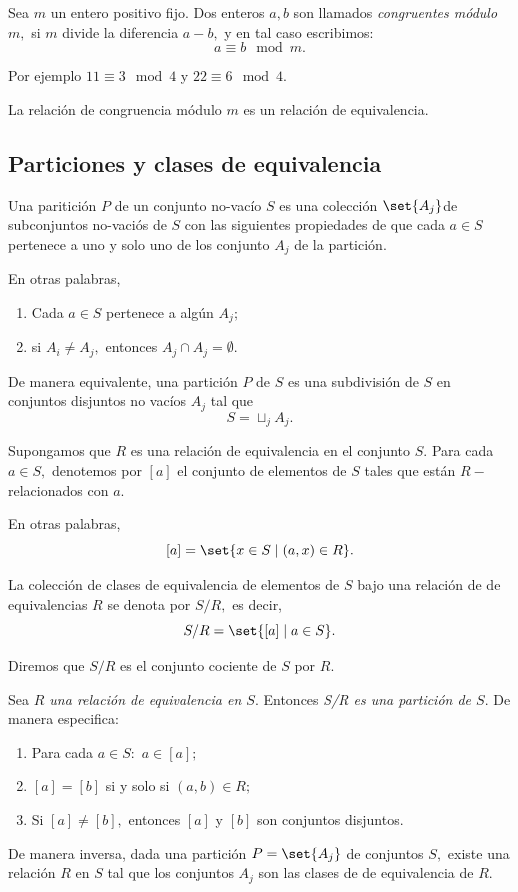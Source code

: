 	\label{lip:exmp:2.12.c}
	Sea $m$ un entero positivo fijo. Dos enteros $a,b$ son llamados \emph{congruentes módulo $m,$} si $m$ divide la diferencia $a-b,$ y en tal caso escribimos:
	$$
	a\equiv b \mod m.
	$$


	Por ejemplo $11\equiv 3 \mod 4$ y $22\equiv 6 \mod 4.$


	La relación de congruencia módulo $m$ es un relación de equivalencia.



\subsection{Particiones y clases de equivalencia}


	Una paritición $P$ de un conjunto no-vacío $S$ es una colección $\set{A_{j}}$de subconjuntos no-vaciós de $S$ con las siguientes propiedades de que cada $a\in S$ pertenece a uno y solo uno de los conjunto $A_{j}$ de la partición.

	En otras palabras,
	\begin{enumerate}
		\item Cada $a\in S$ pertenece a algún $A_{j};$
		\item si $A_{i}\neq A_{j},$ entonces $A_{j}\cap A_{j}=\emptyset.$

	\end{enumerate}


	De manera equivalente, una partición $P$ de $S$ es una subdivisión de $S$ en conjuntos disjuntos no vacíos $A_{j}$ tal que $$S= \sqcup_{j} A_{j}.$$



	Supongamos que $R$ es una relación de equivalencia en el conjunto $S.$ Para cada $a\in S,$ denotemos por $[a]$ el conjunto de elementos de $S$ tales que están $R-$relacionados con $a.$


	En otras palabras,
	$$
	[a]=\set{x \in S \mid (a,x)\in R}.
	$$



	La colección de clases de equivalencia de elementos de $S$ bajo una relación de de equivalencias $R$ se denota por $S/R,$ es decir,
	$$
	S/R=\set{[a] \mid a \in S}.
	$$


	Diremos que $S/R$ es el conjunto cociente de $S$ por $R.$



	\begin{teorema}
		\label{lip:thm:2.6}
		Sea \emph{$R$ una relación de equivalencia en $S.$} Entonces \emph{S/R es una partición de $S.$}
		De manera especifica:
		\begin{enumerate}
			\item Para cada $a \in S:$  $a\in [a];$
			\item $[a]=[b]$ si y solo si $(a,b)\in R;$
			\item Si $[a]\neq [b],$ entonces $[a]$ y $[b]$ son conjuntos disjuntos.
		\end{enumerate}


		De manera inversa, dada una partición $P=\set{A_{j}}$ de conjuntos $S,$ existe una relación $R$ en $S$ tal que los conjuntos $A_{j}$ son las clases de de equivalencia de $R.$
	\end{teorema}




